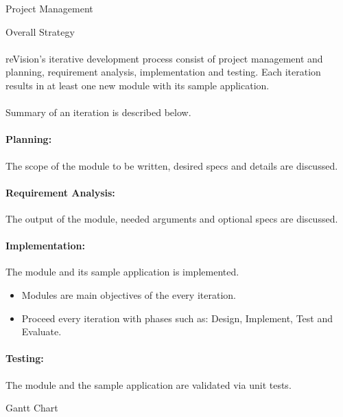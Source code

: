 \documentclass[12pt, a4paper]{article} \pagenumbering{gobble}
\begin{document}
\begin{section}{Project Management}
  \begin{subsection}{Overall Strategy}
    \paragraph{}{reVision's iterative development process consist of project management and planning, requirement analysis, implementation and testing. Each iteration results in at least one new module with its sample application.}\\ \\
    Summary of an iteration is described below.
    \paragraph{Planning:}{The scope of the module to be written, desired specs and details are discussed.}
    \paragraph{Requirement Analysis:}{The output of the module, needed arguments and optional specs are discussed.}
    \paragraph{Implementation:}{The module and its sample application is implemented.
    \begin{itemize}
      \item Modules are main objectives of the every iteration.
      \item Proceed every iteration with phases such as: Design, Implement, Test and Evaluate.
    \end{itemize}}
    \paragraph{Testing:}{The module and the sample application are validated via unit tests.}
  \end{subsection}

  \newpage

  \begin{subsection}{Gantt Chart}
  \vspace*{\fill}
  \begin{centering}
\end{centering}
\end{subsection}
\end{section}
\end{document}
